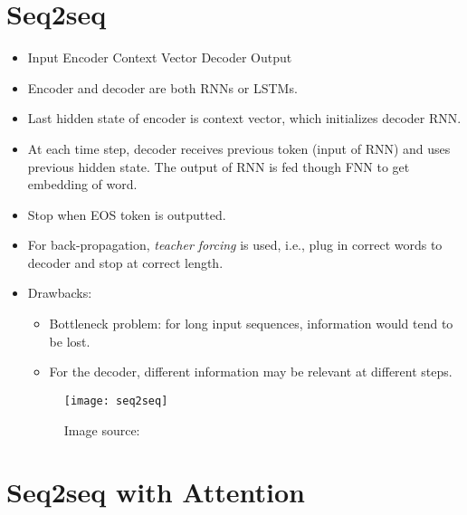 \documentclass[../ds]{subfiles}
\begin{document}
\section{Seq2seq}

\begin{itemize}
\item 
Input \textrightarrow{} Encoder \textrightarrow{} Context Vector \textrightarrow{} Decoder \textrightarrow{} Output

\item 
Encoder and decoder are both RNNs or LSTMs.

\item 
Last hidden state of encoder is context vector, which initializes decoder RNN.

\item 
At each time step, decoder receives previous token (input of RNN) and uses previous hidden state. The output of RNN is fed though FNN to get embedding of word.

\item 
Stop when EOS token is outputted.

\item 
For back-propagation, \textit{teacher forcing} is used, i.e., plug in correct words to decoder and stop at correct length.

\item Drawbacks:
\begin{itemize}
\item 
Bottleneck problem: for long input sequences, information would tend to be lost.

\item 
For the decoder, different information may be relevant at different steps.
\end{itemize}
\begin{figure}[ht]
	\centering
	\texttt{[image: seq2seq]}
	\caption*{Image source: \cite{seq2seq_eddy}}
\end{figure}
\end{itemize}

\section{Seq2seq with Attention}
\end{document}
